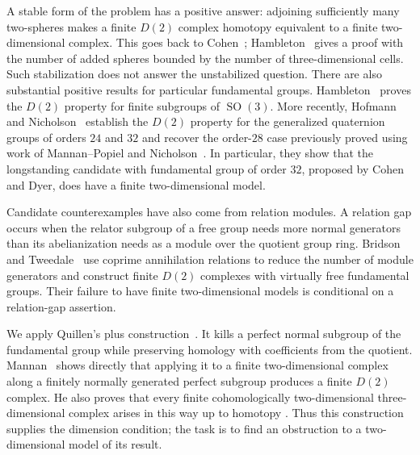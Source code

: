 A stable form of the problem has a positive answer: adjoining
sufficiently many two-spheres makes a finite $D(2)$ complex homotopy
equivalent to a finite two-dimensional complex. This goes back to
Cohen~\cite{Cohen78}; Hambleton~\cite[Lemma~2.1]{Hambleton18} gives
a proof with the number of added spheres bounded by the number of
three-dimensional cells. Such stabilization does not answer the
unstabilized question. There are also substantial positive results
for particular fundamental groups. Hambleton~\cite[Theorem~B]{Hambleton18}
proves the $D(2)$ property for finite subgroups of $\operatorname{SO}(3)$.
More recently, Hofmann and Nicholson~\cite[Theorem~A]{HofmannNicholson27}
establish the $D(2)$ property for the generalized quaternion groups of
orders $24$ and $32$ and recover the order-$28$ case previously proved
using work of Mannan--Popiel and Nicholson~\cite{MannanPopiel21,Nicholson21}.
In particular,
they show that the longstanding candidate
with fundamental group of order $32$, proposed by Cohen and Dyer,
does have a finite two-dimensional model.

Candidate counterexamples have also come from relation modules.
A relation gap occurs when the relator subgroup of a free group needs
more normal generators than its abelianization needs as a module over
the quotient group ring.
Bridson and Tweedale~\cite[Sections~3--4]{BridsonTweedale07} use
coprime annihilation relations to reduce the number of module generators
and construct finite $D(2)$ complexes with virtually free fundamental
groups. Their failure to have finite two-dimensional models is conditional
on a relation-gap assertion.

We apply Quillen's plus construction~\cite{Quillen71}. It kills a
perfect normal subgroup of the fundamental
group while preserving homology with coefficients from the quotient.
Mannan~\cite[Section~2]{Mannan09} shows directly that applying it to a
finite two-dimensional complex along a finitely normally generated
perfect subgroup produces a finite $D(2)$ complex. He also proves
that every finite cohomologically two-dimensional three-dimensional
complex arises in this way up to homotopy
\cite[Theorem~3.4]{Mannan09}. Thus this construction supplies the
dimension condition; the task is to find an obstruction to a
two-dimensional model of its result.

